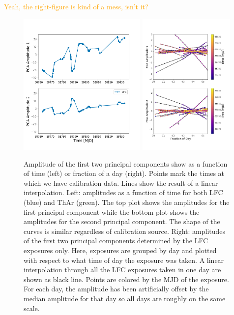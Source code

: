 \documentclass[12pt, letterpaper]{article}
\newcommand{\lz}[1]{\textcolor{orange}{#1}}
\begin{document}
\lz{Yeah, the right-figure is kind of a mess, isn't it?}

\begin{figure}[h!]
\centering
\includegraphics[width=0.56\textwidth]{Figures/pcA_lfc.png}
\includegraphics[width=0.42\textwidth]{Figures/pcAs_byDay.png}
\caption{Amplitude of the first two principal components show as a function of time (left) or fraction of a day (right).  Points mark the times at which we have calibration data.  Lines show the result of a linear interpolation.  Left: amplitudes as a function of time for both LFC (blue) and ThAr (green).  The top plot shows the amplitudes for the first principal component while the bottom plot shows the amplitudes for the second principal component.  The shape of the curves is similar regardless of calibration source.
Right: amplitudes of the first two principal components determined by the LFC exposures only.  Here, exposures are grouped by day and plotted with respect to what time of day the exposure was taken.  A linear interpolation through all the LFC exposures taken in one day are shown as black line.  Points are colored by the MJD of the exposure.  For each day, the amplitude has been artificially offset by the median amplitude for that day so all days are roughly on the same scale.}
\label{fig:nightlyVariation}
\end{figure} 
\end{document}
